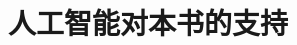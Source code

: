 \documentclass[../../book-main_zh.tex]{subfiles}
\begin{document}
\chapter*{人工智能对本书的支持}

 
\end{document}

